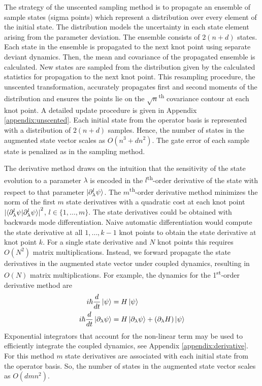 The strategy of the unscented sampling method is to
propagate an ensemble of sample states (sigma points) which represent a distribution
over every element of the initial state. The distribution
models the uncertainty in each state element arising from the
parameter deviation. The ensemble consists of $2 (n + d)$ states.
Each state in the
ensemble is propagated to the next
knot point using separate deviant dynamics. Then, the mean and covariance of
the propagated ensemble is calculated. New states are sampled from the distribution
given by the calculated statistics for propagation to the next knot point.
This resampling procedure, the unscented transformation, accurately propagates
first and second moments of the distribution and ensures the points
lie on the $\sqrt{n}$\textsuperscript{th}
covariance contour at each knot point. A detailed update procedure is given
in Appendix \ref{appendix:unscented}. Each initial state from the operator basis
is represented with a distribution of $2 (n + d)$ samples. Hence,
the number of states in the augmented state vector scales as $O(n^{3} + dn^{2})$.
The gate error of each sample state is penalized as in the sampling method.

The derivative method draws on the intuition that
the sensitivity of the state evolution to a parameter
$\lambda$ is encoded in the $l$\textsuperscript{th}-order
derivative of the state with respect to that parameter
$\ket{\partial_{\lambda}^{l} \psi}$. The $m$\textsuperscript{th}-order
derivative method minimizes the norm of the first $m$
state derivatives with a quadratic cost at each knot point
${\lvert \braket{\partial^{l}_{\lambda} \psi | \partial^{l}_{\lambda} \psi}
  \rvert}^{2}$, $l \in \{1, \dots, m\}$.
The state derivatives could be obtained with backwards mode differentiation.
Naive automatic differentiation would compute
the state derivative at all $1, \dots, k - 1$ knot points
to obtain the state derivative at knot point $k$.
For a single state derivative and $N$ knot points this
requires $O(N^2)$ matrix multiplications.
Instead, we forward propagate the state derivatives in the
augmented state vector under coupled dynamics, resulting in
$O(N)$ matrix multiplications. For example, the dynamics
for the 1\textsuperscript{st}-order derivative method are
\begin{align}
  i \hbar \frac{d}{dt} \ket{\psi} &= H \ket{\psi}\\
  i \hbar \frac{d}{dt} \ket{\partial_{\lambda}\psi} &=
  H \ket{\partial_{\lambda} \psi} +
  (\partial_{\lambda} H) \ket{\psi}
\end{align}
Exponential integrators that account for the non-linear
term may be used to efficiently integrate the coupled dynamics,
see Appendix \ref{appendix:derivative}.
For this method $m$ state derivatives are associated with each
initial state from the operator basis.
So, the number of states in the augmented state vector scales as
$O(dmn^{2})$.

